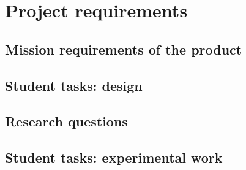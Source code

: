 
\section{Project requirements}


\subsection{Mission requirements of the product}

\subsection{Student tasks: design}

\vspace{1em}

\subsection{Research questions}

\subsection{Student tasks: experimental work}

\newpage



